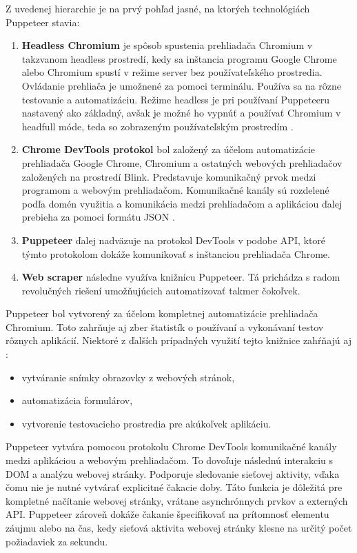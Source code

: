 \bigskip

Z uvedenej hierarchie je na prvý pohľad jasné, na ktorých technológiách Puppeteer stavia:

\begin{enumerate}
  \item \textbf{Headless Chromium} je spôsob spustenia prehliadača Chromium v takzvanom headless prostredí, kedy sa inštancia programu Google Chrome alebo Chromium spustí v režime server bez používateľského prostredia. Ovládanie prehliača je umožnené za pomoci terminálu. Používa sa na rôzne testovanie a automatizáciu. Režime headless je pri používaní Puppeteeru nastavený ako základný, avšak je možné ho vypnúť a používať Chromium v headfull móde, teda so zobrazeným používateľským prostredím \cite{chromium}.
  \item \textbf{Chrome DevTools protokol} bol založený za účelom automatizácie prehliadača Google Chrome, Chromium a ostatných webových prehliadačov založených na prostredí Blink. Predstavuje komunikačný prvok medzi programom a webovým prehliadačom. Komunikačné kanály sú rozdelené podľa domén využitia a komunikácia medzi prehliadačom a aplikáciou ďalej prebieha za pomoci formátu JSON \cite{devtools}.
  \item \textbf{Puppeteer} ďalej nadväzuje na protokol DevTools v podobe API, ktoré týmto protokolom dokáže komunikovať s inštanciou prehliadača Chrome.
  \item \textbf{Web scraper} následne využíva knižnicu Puppeteer. Tá prichádza s radom revolučných riešení umožňujúcich automatizovať takmer čokoľvek.
\end{enumerate}

\newpage

Puppeteer bol vytvorený za účelom kompletnej automatizácie prehliadača Chromium. Toto zahrňuje aj zber štatistík o používaní a vykonávaní testov rôznych aplikácií. Niektoré z ďalších prípadných využití tejto knižnice zahŕňajú aj \cite{puppeteer}:
\begin{itemize}
    \item vytváranie snímky obrazovky z webových stránok,
    \item automatizácia formulárov,
    \item vytvorenie testovacieho prostredia pre akúkoľvek aplikáciu.
\end{itemize}

\bigskip

Puppeteer vytvára pomocou protokolu Chrome DevTools komunikačné kanály medzi aplikáciou a webovým prehliadačom. To dovoľuje následnú interakciu s DOM a analýzu webovej stránky. Podporuje sledovanie sieťovej aktivity, vďaka čomu nie je nutné vytvárať explicitné čakacie doby. Táto funkcia je dôležitá pre kompletné načítanie webovej stránky, vrátane asynchrónnych prvkov a externých API. Puppeteer zároveň dokáže čakanie špecifikovať na prítomnosť elementu záujmu alebo na čas, kedy sieťová aktivita webovej stránky klesne na určitý počet požiadaviek za sekundu.

